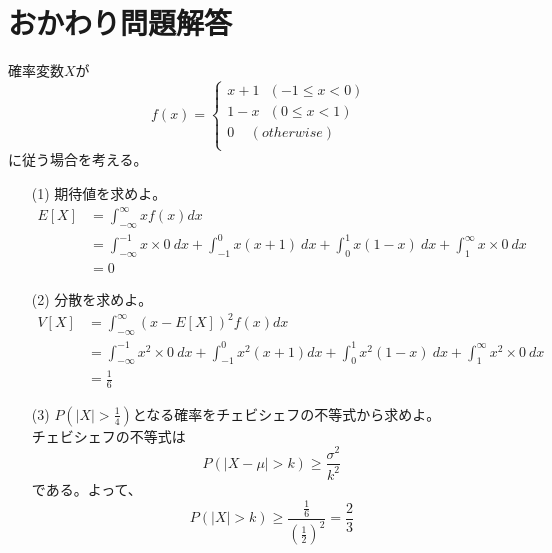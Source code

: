 \documentclass[a4j,uplatex,dvipdfmx]{jsarticle}
\begin{document}
\section*{おかわり問題解答}
確率変数$X$が
\begin{equation}
  f(x)=
 \begin{cases}
   x+1~~~(-1\le x<0)\\
   1-x~~~(0\le x<1)\\
   0~~~~~(otherwise)\\
 \end{cases}
\end{equation}
に従う場合を考える。
\begin{itemize}
  \item[(1)] 期待値を求めよ。
   \begin{equation}
     \begin{split}
       E[X] &= \int_{-\infty}^{\infty} x f(x) dx\\
       &= \int_{-\infty}^{-1} x\times 0\ dx + \int_{-1}^{0} x(x+1)\ dx + \int_{0}^{1} x(1-x)\ dx + \int_{1}^{\infty} x \times 0\ dx \\
       &= 0
     \end{split}
   \end{equation}
  \item[(2)] 分散を求めよ。
  \begin{equation}
    \begin{split}
      V[X] &= \int_{-\infty}^{\infty} (x-E[X])^2f(x) dx \\
      &=\int_{-\infty}^{-1} x^2\times 0\ dx + \int_{-1}^{0} x^2(x+1) dx + \int_{0}^{1} x^2(1-x)\ dx + \int_{1}^{\infty} x^2 \times 0\ dx \\
      &=\frac{1}{6}
    \end{split}
  \end{equation} 
  \item[(3)] $\displaystyle P(|X|>\frac{1}{4})$となる確率をチェビシェフの不等式から求めよ。\\
  チェビシェフの不等式は
  \begin{equation}
      P(|X-\mu|>k)\ge \frac{\sigma ^2}{k^2}
  \end{equation} 
  である。よって、
  \begin{equation}
    P(|X|>k)\ge \frac{\frac{1}{6}}{\left( \frac{1}{2} \right)^2} = \frac{2}{3}
  \end{equation}
\end{itemize}
\end{document}
